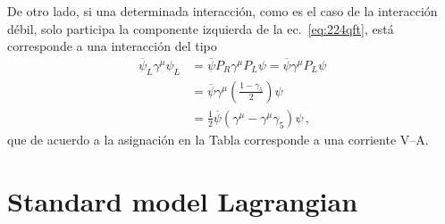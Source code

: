 De otro lado, si una determinada interacción, como es el caso de la interacción débil, solo participa la componente izquierda de la ec.~\eqref{eq:224qft}, está corresponde a una interacción del tipo
\begin{align}
  \overline{\psi}_L\gamma^\mu\psi_L&=\overline{\psi}P_R\gamma^\mu P_L\psi=\overline{\psi}\gamma^\mu P_L\psi\nonumber\\
  &=\overline{\psi}\gamma^\mu\left(\frac{1-\gamma_5}{2}\right)\psi\nonumber\\
  &=\tfrac{1}{2}\overline{\psi}\left(\gamma^\mu-\gamma^\mu\gamma_5\right)\psi\,,
\end{align}
que de acuerdo a la asignación en la Tabla corresponde a una corriente V--A. 

\section{Standard model Lagrangian}
\label{sec:stand-model-lagr}

